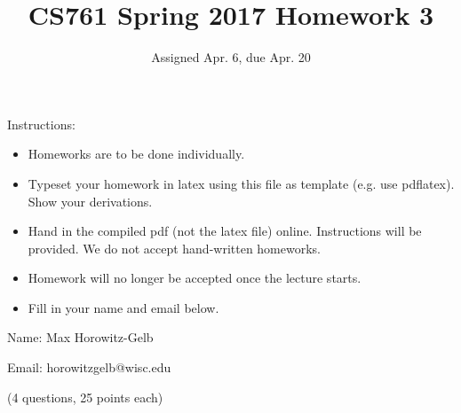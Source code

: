 \documentclass{article}
\title{CS761 Spring 2017 Homework 3}
\author{Assigned Apr. 6, due Apr. 20}
\date{}
\begin{document}
\maketitle

Instructions: 
\begin{itemize}
\item Homeworks are to be done individually.
\item Typeset your homework in latex using this file as template (e.g. use pdflatex).  Show your derivations.
\item Hand in the compiled pdf (not the latex file) online.  Instructions will be provided.  We do not accept hand-written homeworks.  
\item Homework will no longer be accepted once the lecture starts.
\item Fill in your name and email below.  
\end{itemize}


Name:   \color{blue} Max Horowitz-Gelb \color{black}                   

Email: \color{blue} horowitzgelb@wisc.edu \color{black}

\newpage %

(4 questions, 25 points each)
\end{document}
